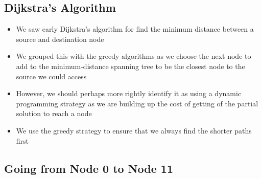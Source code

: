 \begin{slide}
\section{Dijkstra's Algorithm}

\begin{PauseHighLight}
  \begin{itemize}
  \item We saw early Dijkstra's algorithm for find the minimum distance
    between a source and destination node\pause
  \item We grouped this with the greedy algorithms as we choose the next
    node to add to the minimum-distance spanning tree to be the closest
    node to the source we could access\pause
  \item However, we should perhaps more rightly identify it as using a
    dynamic programming strategy as we are building up the cost of
    getting of the partial solution to reach a node\pause
  \item We use the greedy strategy to ensure that we always find the
    shorter paths first\pause
  \end{itemize}
\end{PauseHighLight}

\end{slide}


\begin{slide}
\section{Going from Node 0 to Node 11}

\pb\pause{}
\begin{center}
  \pause
\end{center}
\end{slide}


